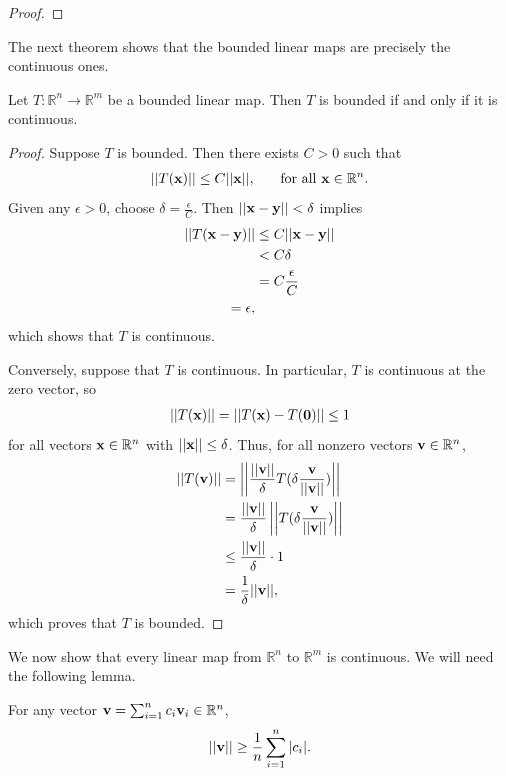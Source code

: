 \documentclass[12pt,letterpaper,reqno]{article}
\numberwithin{equation}{section}
\newcommand{\R}{\ensuremath{\mathbb R}}
\newcommand{\bv}{{\bf v}}
\newcommand{\bx}{{\bf x}}
\newcommand{\by}{{\bf y}}
\newcommand{\fixme}[1]{{\color{orange}{[#1]}}}
\begin{document}
{\begin{proof}
	\fixme{Finish.}
\end{proof}



The next theorem shows that the bounded linear maps are precisely the continuous ones.

\begin{thm}
Let $T:\R^n \to \R^m$ be a bounded linear map. Then $T$ is bounded if and only if it is continuous.
\end{thm}

\begin{proof}
	Suppose $T$ is bounded. Then there exists $C>0$ such that 
	\begin{align*}
		||T(\bx)||\leq C||\bx||, \hspace{0.5cm} \text{ for all } \bx \in \R^n.
	\end{align*}
	Given any $\epsilon>0$, choose $\delta=\frac{\epsilon}{C}$. Then $||\bx-\by||<\delta$ implies 
	\begin{align*}
		||T(\bx-\by)||&\leq C||\bx-\by|| \\
		&<C\delta \\
		&=C\frac{\epsilon}{C} \\
		=\epsilon,
	\end{align*}
	which shows that $T$ is continuous.
	
	Conversely, suppose that $T$ is continuous. In particular, $T$ is continuous at the zero vector, so 
	\begin{align*}
		||T(\bx)||=||T(\bx)-T({\bf 0})||\leq 1
	\end{align*}
	for all vectors $\bx \in \R^n$ with $||\bx||\leq \delta$. Thus, for all nonzero vectors $\bv \in \R^n$,
	\begin{align*}
		||T(\bv)||&=\left|\left|\frac{||\bv||}{\delta}T(\delta \frac{\bv}{||\bv||})\right|\right| \\
		&=\frac{||\bv||}{\delta}\left|\left|T(\delta \frac{\bv}{||\bv||})\right|\right| \\
		&\leq \frac{||\bv||}{\delta} \cdot 1 \\
		&=\frac{1}{\delta}||\bv||,
	\end{align*}
	which proves that $T$ is bounded.
\end{proof}

We now show that every linear map from $\R^n$ to $\R^m$ is continuous. We will need the following lemma.

\begin{lem}\label{eq:inequality_we_need}
	For any vector $\bv=\sum_{i=1}^nc_i\bv_i \in \R^n$,
	\begin{align*}
		||\bv|| \geq \frac{1}{n}\sum_{i=1}^n|c_i|.
	\end{align*}
\end{lem}

}
\end{document}

